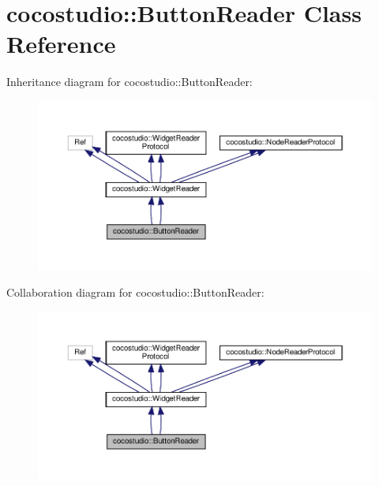 \hypertarget{classcocostudio_1_1ButtonReader}{}\section{cocostudio\+:\+:Button\+Reader Class Reference}
\label{classcocostudio_1_1ButtonReader}


Inheritance diagram for cocostudio\+:\+:Button\+Reader\+:
\nopagebreak
\begin{figure}[H]
\begin{center}
\leavevmode
\includegraphics[width=350pt]{classcocostudio_1_1ButtonReader__inherit__graph}
\end{center}
\end{figure}


Collaboration diagram for cocostudio\+:\+:Button\+Reader\+:
\nopagebreak
\begin{figure}[H]
\begin{center}
\leavevmode
\includegraphics[width=350pt]{classcocostudio_1_1ButtonReader__coll__graph}
\end{center}
\end{figure}
